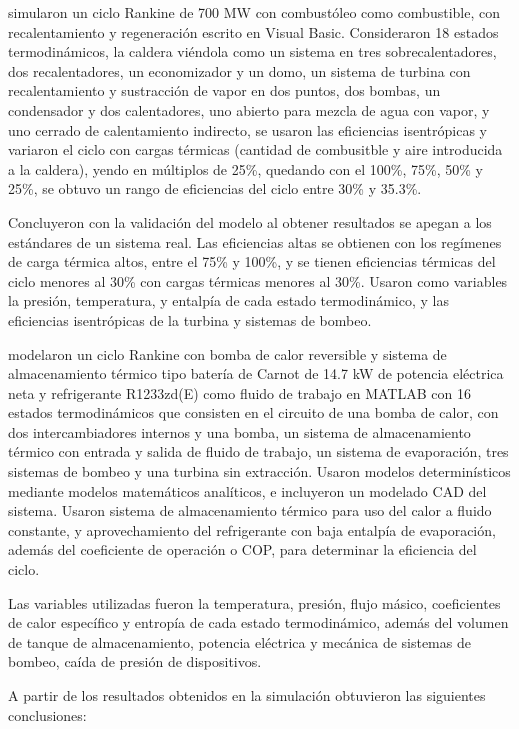 \textcite{jimenez2021simulacion} simularon un ciclo Rankine de 700 MW con combustóleo como combustible, con recalentamiento y regeneración escrito en Visual Basic. Consideraron 18 estados termodinámicos, la caldera viéndola como un sistema en tres sobrecalentadores, dos recalentadores, un economizador y un domo, un sistema de turbina con recalentamiento y sustracción de vapor en dos puntos, dos bombas, un condensador y dos calentadores, uno abierto para mezcla de agua con vapor, y uno cerrado de calentamiento indirecto, se usaron las eficiencias isentrópicas y variaron el ciclo con cargas térmicas (cantidad de combusitble y aire introducida a la caldera), yendo en múltiplos de 25\%, quedando con el 100\%, 75\%, 50\% y 25\%, se obtuvo un rango de eficiencias del ciclo entre 30\% y 35.3\%. 

Concluyeron con la validación del modelo al obtener resultados se apegan a los estándares de un sistema real. Las eficiencias altas se obtienen con los regímenes de carga térmica altos, entre el 75\% y 100\%, y se tienen eficiencias térmicas del ciclo menores al 30\% con cargas térmicas menores al 30\%. Usaron como variables la presión, temperatura, y entalpía de cada estado termodinámico, y las eficiencias isentrópicas de la turbina y sistemas de bombeo.


\textcite{EPPINGER2021116650} modelaron un ciclo Rankine con bomba de calor reversible y sistema de almacenamiento térmico tipo batería de Carnot de 14.7 kW de potencia eléctrica neta y refrigerante R1233zd(E) como fluido de trabajo en MATLAB con 16 estados termodinámicos que consisten en el circuito de una bomba de calor, con dos intercambiadores internos y una bomba, un sistema de almacenamiento térmico con entrada y salida de fluido de trabajo, un sistema de evaporación, tres sistemas de bombeo y una turbina sin extracción. Usaron modelos determinísticos mediante modelos matemáticos analíticos, e incluyeron un modelado CAD del sistema. Usaron sistema de almacenamiento térmico para uso del calor a fluido constante, y aprovechamiento del refrigerante con baja entalpía de evaporación, además del coeficiente de operación o COP, para determinar la eficiencia del ciclo.

Las variables utilizadas fueron la temperatura, presión, flujo másico, coeficientes de calor específico y entropía de cada estado termodinámico, además del volumen de tanque de almacenamiento, potencia eléctrica y mecánica de sistemas de bombeo, caída de presión de dispositivos.

A partir de los resultados obtenidos en la simulación obtuvieron las siguientes conclusiones:

